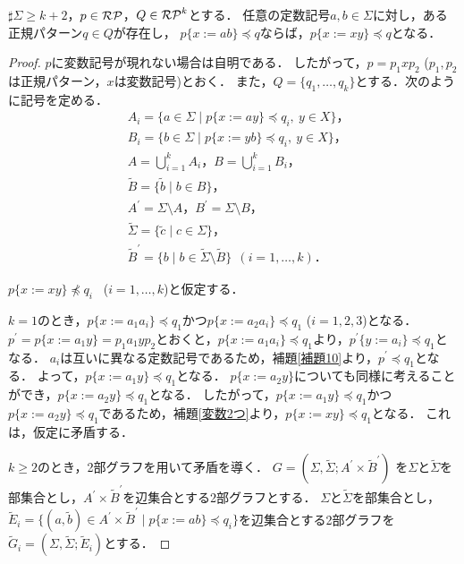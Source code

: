 \begin{lem}\label{追加補題1}
$\sharp \Sigma \ge k+2$，$p \in \mathcal{RP}$，$Q \in \mathcal{RP}^{k}$とする．
任意の定数記号$a, b \in \Sigma$に対し，ある正規パターン$q \in Q$が存在し，
$p \{ x:=ab \} \preceq q$ならば，$p \{ x:=xy \} \preceq q$となる．
\end{lem}
\begin{proof}
$p$に変数記号が現れない場合は自明である．
したがって，$p=p_{1}xp_{2}$ ($p_{1},p_{2}$は正規パターン，$x$は変数記号)とおく．
また，$Q=\{ q_{1}, \ldots , q_{k} \}$とする．次のように記号を定める．
\begin{align*}
& A_{i} = \{ a \in \Sigma \mid p \{ x:=ay \} \preceq q_{i},\ y\in X\}，\\ 
& B_{i} = \{ b \in \Sigma \mid p \{ x:=yb \} \preceq q_{i},\ y\in X\}，\\ 
& A = \bigcup_{i=1}^{k}A_{i}，B = \bigcup_{i=1}^{k} B_{i}，\\
& \tilde{B} = \{ \tilde{b} \mid b \in B \}，\\
& A^{\prime} = \Sigma\setminus A，B^{\prime} = \Sigma\setminus B，\\
& \tilde{\Sigma} = \{ \tilde{c} \mid c \in \Sigma \}，\\
& \tilde{B}^{\prime} = \{ b \mid b \in \tilde{\Sigma} \setminus \tilde{B} \}~~(i=1, \ldots , k)．
\end{align*}

$p \{ x:=xy \} \not \preceq q_{i}$ \ ($i=1, \ldots , k$)と仮定する．

$k=1$のとき，$p \{ x:=a_{1}a_{i} \} \preceq q_{1}$かつ$p \{ x:=a_{2}a_{i} \} \preceq q_{1}$ ($i=1,2,3$)となる．
$p^{\prime} = p \{ x:=a_{1}y \} = p_{1}a_{1}yp_{2}$とおくと，$p \{ x:=a_{1}a_{i} \} \preceq q_{1}$より，$p^{\prime} \{ y:=a_{i} \} \preceq q_{1}$となる．
$a_{i}$は互いに異なる定数記号であるため，補題\ref{補題10}より，$p^{\prime} \preceq q_{1}$となる．
よって，$p \{ x:=a_{1}y \} \preceq q_{1}$となる．
$p \{ x:=a_{2}y \}$についても同様に考えることができ，$p \{ x:=a_{2}y \} \preceq q_{1}$となる．
したがって，$p \{ x:=a_{1}y \} \preceq q_{1}$かつ$p \{ x:=a_{2}y \} \preceq q_{1}$であるため，補題\ref{変数2つ}より，$p \{ x:= xy \} \preceq q_{1}$となる．
これは，仮定に矛盾する．

$k \ge 2$のとき，2部グラフを用いて矛盾を導く．
$G=(\Sigma,\tilde{\Sigma}; A^{\prime} \times \tilde{B}^{\prime})$
を$\Sigma$と$\tilde{\Sigma}$を部集合とし，$A^{\prime} \times \tilde{B}^{\prime}$を辺集合とする2部グラフとする．
$\Sigma$と$\tilde{\Sigma}$を部集合とし，$\tilde{E}_{i}=\{ (a, \tilde{b}) \in A^{\prime} \times \tilde{B}^{\prime} \mid p \{ x:=ab \} \preceq q_{i} \}$を辺集合とする2部グラフを$\tilde{G}_{i}=(\Sigma,\tilde{\Sigma}; \tilde{E}_{i})$とする．


\end{proof}
